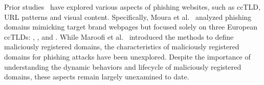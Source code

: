 Prior studies~\cite{maroofi2020comar,moura2024characterizing,hao2013understanding,oest2019phishfarm,oest2020phishtime,oest2020sunrise} have explored various aspects of phishing websites, such as ccTLD, URL patterns and visual content.
Specifically, Moura et al.~\cite{moura2024characterizing} analyzed phishing domains mimicking target brand webpages but focused solely on three European ccTLDs: , , and .
While Maroofi et al.~\cite{maroofi2020comar} introduced the methods to define maliciously registered domains,
the characteristics of maliciously registered domains for phishing attacks have been unexplored.
Despite the importance of understanding the dynamic behaviors and lifecycle of maliciously registered domains, these aspects remain largely unexamined to date.
% 
%
%

